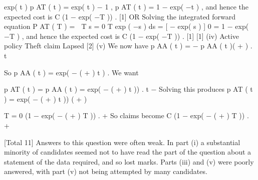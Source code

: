 \documentclass[a4paper,12pt]{article}
\begin{document}
exp( \mu t ) p AT ( t ) = exp( \mu t ) − 1 ,
p AT ( t ) = 1 − exp( −\mu t ) ,
and hence the expected cost is C (1 − exp( −\mu T )) .
[1]
OR
Solving the integrated forward equation
P AT ( T ) = 
T
s = 0
T
exp ( −\mu s ) \mu ds = [ − exp( \mu s ) ] 0 = 1 − exp( −\mu T ) ,
and hence the expected cost is C (1 − exp( −\mu T )) .
[1]
[1]
(iv)
\mu
Active
policy
Theft
claim
\lambda
Lapsed
[2]
(v)
We now have
\partial
p AA ( t ) = − p AA ( t )( \mu + \lambda ) .
\partial t

So p AA ( t ) = exp( − ( \mu + \lambda ) t ) .
We want

\partial
p AT ( t ) = p AA ( t ) \mu = \mu exp( − ( \mu + \lambda ) t )) .
\partial t
−\mu
Solving this produces p AT ( t ) =
exp( − ( \mu + \lambda ) t ))
( \mu + \lambda )

T
=
0
\mu
(1 − exp( − ( \mu + \lambda ) T )) .
\mu+\lambda
[1]
So claims become
\mu
C (1 − exp( − ( \mu + \lambda ) T )) .
\mu+\lambda

[Total 11]
Answers to this question were often weak. In part (i) a substantial minority of
candidates seemed not to have read the part of the question about a
statement of the data required, and so lost marks. Parts (iii) and (v) were
poorly answered, with part (v) not being attempted by many candidates.
\end{document}
